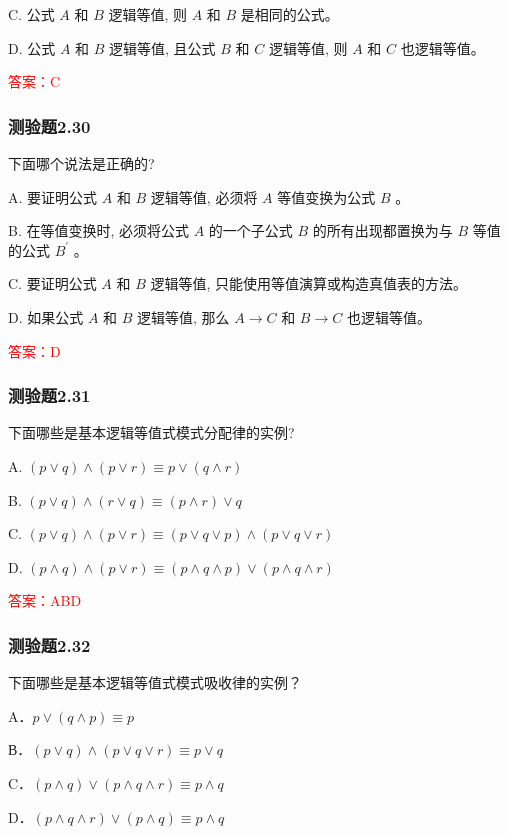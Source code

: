 \documentclass[UTF8, heading=true]{ctexart}
\begin{document}
C. 公式 $A$ 和 $B$ 逻辑等值, 则 $A$ 和 $B$ 是相同的公式。

D. 公式 $A$ 和 $B$ 逻辑等值, 且公式 $B$ 和 $C$ 逻辑等值, 则 $A$ 和 $C$ 也逻辑等值。

\textcolor{red}{答案：C}

\subsubsection{测验题2.30}

下面哪个说法是正确的?

A. 要证明公式 $A$ 和 $B$ 逻辑等值, 必须将 $A$ 等值变换为公式 $B$ 。

B. 在等值变换时, 必须将公式 $A$ 的一个子公式 $B$ 的所有出现都置换为与 $B$ 等值的公式 $B^{\prime}$ 。

C. 要证明公式 $A$ 和 $B$ 逻辑等值, 只能使用等值演算或构造真值表的方法。

D. 如果公式 $A$ 和 $B$ 逻辑等值, 那么 $A \rightarrow C$ 和 $B \rightarrow C$ 也逻辑等值。

\textcolor{red}{答案：D}

\subsubsection{测验题2.31}

下面哪些是基本逻辑等值式模式分配律的实例?

A. $(p \vee q) \wedge(p \vee r) \equiv p \vee(q \wedge r)$

B. $(p \vee q) \wedge(r \vee q) \equiv(p \wedge r) \vee q$

C. $(p \vee q) \wedge(p \vee r) \equiv(p \vee q \vee p) \wedge(p \vee q \vee r)$

D. $(p \wedge q) \wedge(p \vee r) \equiv(p \wedge q \wedge p) \vee(p \wedge q \wedge r)$

\textcolor{red}{答案：ABD}

\subsubsection{测验题2.32}

下面哪些是基本逻辑等值式模式吸收律的实例？

A．$p \vee(q \wedge p) \equiv p$

В．$(p \vee q) \wedge(p \vee q \vee r) \equiv p \vee q$

C．$(p \wedge q) \vee(p \wedge q \wedge r) \equiv p \wedge q$

D．$(p \wedge q \wedge r) \vee(p \wedge q) \equiv p \wedge q$
\end{document}
